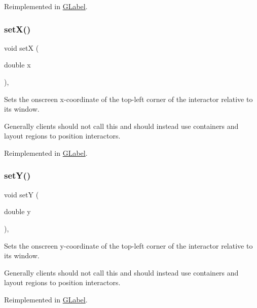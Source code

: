Reimplemented in \mbox{\hyperlink{classGLabel_af0c5b6fb4e3c3c9a3fabde548efa93db}{G\+Label}}.

\mbox{\label{classGInteractor_a9c18fcc579333bf9653d13ad2b372e39}} 
\subsubsection{\texorpdfstring{set\+X()}{setX()}}
{\footnotesize\ttfamily void setX (\begin{DoxyParamCaption}\item[{double}]{x }\end{DoxyParamCaption})\hspace{0.3cm}{\ttfamily [virtual]}, {\ttfamily [inherited]}}



Sets the onscreen x-\/coordinate of the top-\/left corner of the interactor relative to its window. 

Generally clients should not call this and should instead use containers and layout regions to position interactors. 

Reimplemented in \mbox{\hyperlink{classGLabel_a173837ba805eaa2411e88834869d3a9c}{G\+Label}}.

\mbox{\label{classGInteractor_a7d57e2a5c35d27feb58fd498a3cf82b9}} 
\subsubsection{\texorpdfstring{set\+Y()}{setY()}}
{\footnotesize\ttfamily void setY (\begin{DoxyParamCaption}\item[{double}]{y }\end{DoxyParamCaption})\hspace{0.3cm}{\ttfamily [virtual]}, {\ttfamily [inherited]}}



Sets the onscreen y-\/coordinate of the top-\/left corner of the interactor relative to its window. 

Generally clients should not call this and should instead use containers and layout regions to position interactors. 

Reimplemented in \mbox{\hyperlink{classGLabel_a0b738606c7aca5c472b66c4e55b3c685}{G\+Label}}.


